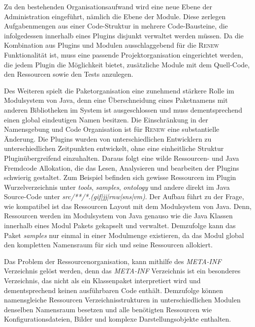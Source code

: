 		Zu den bestehenden Organisationsaufwand wird eine neue Ebene der Administration eingeführt, nämlich die Ebene der Module. Diese zerlegen Aufgabenmengen aus einer Code-Struktur in mehrere Code-Bausteine, die infolgedessen innerhalb eines Plugins disjunkt verwaltet werden müssen.\newline
		Da die Kombination aus Plugins und Modulen ausschlaggebend für die \textsc{Renew} Funktionalität ist, muss eine passende Projektorganisation eingerichtet werden, die jedem Plugin die Möglichkeit bietet, zusätzliche Module mit dem Quell-Code, den Ressourcen sowie den Tests anzulegen.\bigbreak

		Des Weiteren spielt die Paketorganisation eine zunehmend stärkere Rolle im Modulsystem von Java, denn eine Überschneidung eines Paketnamens mit anderen Bibliotheken im System ist ausgeschlossen und muss dementsprechend einen global eindeutigen Namen besitzen. \newline
		Die Einschränkung in der Namensgebung und Code Organisation ist für \textsc{Renew} eine substantielle Änderung. Die Plugins wurden von unterschiedlichen Entwicklern zu unterschiedlichen Zeitpunkten entwickelt, ohne eine einheitliche Struktur Pluginübergreifend einzuhalten. Daraus folgt eine wilde Ressourcen- und Java Fremdcode Allokation, die das Lesen, Analysieren und bearbeiten der Plugins schwierig gestaltet. Zum Beispiel befinden sich gewisse Ressourcen im Plugin Wurzelverzeichnis unter \textit{tools}, \textit{samples}, \textit{ontology} und andere direkt im Java Source-Code unter \textit{src/**/*.(gif|jj|rnw|sns|vm)}. Der Aufbau führt zu der Frage, wie kompatibel ist das Ressourcen Layout mit dem Modulsystem von Java. Denn, Ressourcen werden im Modulsystem von Java genauso wie die Java Klassen innerhalb eines Modul Pakets gekapselt und verwaltet. Demzufolge kann das Paket \textit{samples} nur einmal in einer Modulmenge existieren, da das Modul global den kompletten Namensraum für sich und seine Ressourcen allokiert. \bigbreak 

		Das Problem der Ressourcenorganisation, kann mithilfe des \textit{META-INF} Verzeichnis gelöst werden, denn das \textit{META-INF} Verzeichnis ist ein besonderes Verzeichnis, das nicht als ein Klassenpaket interpretiert wird und dementsprechend keinen ausführbaren Code enthält. Demzufolge können namensgleiche Ressourcen Verzeichnisstrukturen in unterschiedlichen Modulen denselben Namensraum besetzen und alle benötigten Ressourcen wie Konfigurationsdateien, Bilder und komplexe Darstellungsobjekte enthalten.\bigbreak

